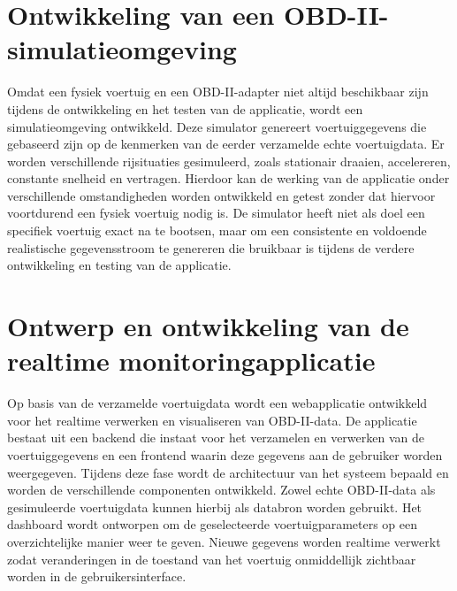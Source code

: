 \section{Ontwikkeling van een OBD-II-simulatieomgeving}
Omdat een fysiek voertuig en een OBD-II-adapter niet altijd beschikbaar zijn tijdens de ontwikkeling en het testen van de applicatie, wordt een simulatieomgeving ontwikkeld. Deze simulator genereert voertuiggegevens die gebaseerd zijn op de kenmerken van de eerder verzamelde echte voertuigdata.
Er worden verschillende rijsituaties gesimuleerd, zoals stationair draaien, accelereren, constante snelheid en vertragen. Hierdoor kan de werking van de applicatie onder verschillende omstandigheden worden ontwikkeld en getest zonder dat hiervoor voortdurend een fysiek voertuig nodig is.
De simulator heeft niet als doel een specifiek voertuig exact na te bootsen, maar om een consistente en voldoende realistische gegevensstroom te genereren die bruikbaar is tijdens de verdere ontwikkeling en testing van de applicatie.

\section{Ontwerp en ontwikkeling van de realtime monitoringapplicatie}
Op basis van de verzamelde voertuigdata wordt een webapplicatie ontwikkeld voor het realtime verwerken en visualiseren van OBD-II-data. De applicatie bestaat uit een backend die instaat voor het verzamelen en verwerken van de voertuiggegevens en een frontend waarin deze gegevens aan de gebruiker worden weergegeven.
Tijdens deze fase wordt de architectuur van het systeem bepaald en worden de verschillende componenten ontwikkeld. Zowel echte OBD-II-data als gesimuleerde voertuigdata kunnen hierbij als databron worden gebruikt.
Het dashboard wordt ontworpen om de geselecteerde voertuigparameters op een overzichtelijke manier weer te geven. Nieuwe gegevens worden realtime verwerkt zodat veranderingen in de toestand van het voertuig onmiddellijk zichtbaar worden in de gebruikersinterface.

